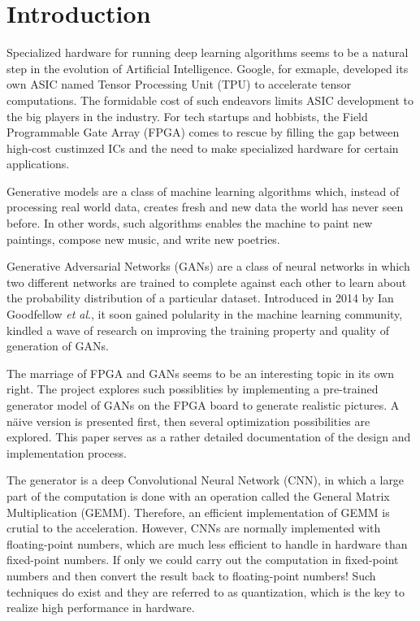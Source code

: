 
\chapter{Introduction}

Specialized hardware for running deep learning algorithms seems to be a natural step in the evolution of
Artificial Intelligence.  Google, for exmaple, developed its own ASIC named Tensor Processing Unit (TPU)
to accelerate tensor computations. The formidable cost of such endeavors limits ASIC development to the big
players in the industry. For tech startups and hobbists, the Field Programmable Gate Array (FPGA) comes to
rescue by filling the gap between high-cost custimzed ICs and the need to make specialized hardware for certain
applications.

Generative models are a class of machine learning algorithms which, instead of processing real world data,
creates fresh and new data the world has never seen before. In other words, such algorithms enables
the machine to paint new paintings, compose new music, and write new poetries.

Generative Adversarial Networks (GANs) are a class of neural networks in which two different networks are
trained to complete against each other to learn about the probability distribution of a particular dataset.
Introduced in 2014 by Ian Goodfellow \textit{et al}., it soon gained polularity in the machine learning
community, kindled a wave of research on improving the training property and quality of generation of GANs.

The marriage of FPGA and GANs seems to be an interesting topic in its own right. The project explores such
possiblities by implementing a pre-trained generator model of GANs on the FPGA board to generate realistic
pictures. A näive version is presented first, then several optimization possibilities are explored. This
paper serves as a rather detailed documentation of the design and implementation process.

The generator is a deep Convolutional Neural Network (CNN), in which a large part of the computation is
done with an operation called the General Matrix Multiplication (GEMM). Therefore, an efficient implementation
of GEMM is crutial to the acceleration. However, CNNs are normally implemented with floating-point numbers,
which are much less efficient to handle in hardware than fixed-point numbers. If only we could carry out
the computation in fixed-point numbers and then convert the result back to floating-point numbers! Such
techniques do exist and they are referred to as quantization, which is the key to realize high performance
in hardware.

\clearpage %
